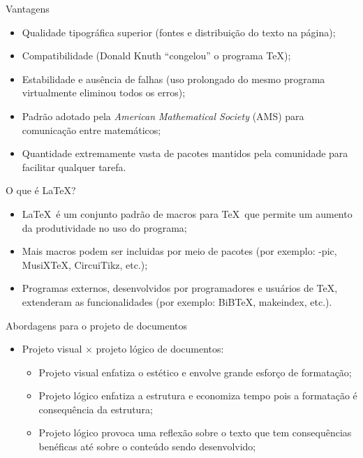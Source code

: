 \begin{frame}{Vantagens}
	\begin{itemize}
		\item Qualidade tipográfica superior (fontes e distribuição do texto na página);
		\pause
		\item Compatibilidade (Donald Knuth ``congelou'' o programa \TeX);
		\pause
		\item Estabilidade e ausência de falhas (uso prolongado do mesmo programa virtualmente eliminou todos os erros);
		\pause
		\item Padrão adotado pela \emph{American Mathematical Society} (AMS) para comunicação entre matemáticos;
		\pause
		\item Quantidade extremamente vasta de pacotes mantidos pela comunidade para facilitar qualquer tarefa.
	\end{itemize}
\end{frame}

\begin{frame}{O que é \LaTeX?}
	\begin{itemize}
		\item \LaTeX\ é um conjunto padrão de macros para \TeX\ que permite um aumento da produtividade no uso do programa;
		\pause
		\item Mais macros podem ser incluidas por meio de pacotes (por exemplo: \Xy-pic, MusiX\TeX, CircuiTikz, etc.);
		\pause
		\item Programas externos, desenvolvidos por programadores e usuários de \TeX, extenderam as funcionalidades (por exemplo: BiB\TeX, makeindex, etc.).
	\end{itemize}
\end{frame}

\begin{frame}{Abordagens para o projeto de documentos}
	\begin{itemize}
		\item Projeto visual $\times$ projeto lógico de documentos:
		\pause
		\begin{itemize}
			\item Projeto visual enfatiza o estético e envolve grande esforço de formatação;
			\pause
			\item Projeto lógico enfatiza a estrutura e economiza tempo pois a formatação é consequência da estrutura;
			\pause
			\item Projeto lógico provoca uma reflexão sobre o texto que tem consequências benéficas até sobre o conteúdo sendo desenvolvido;
		\end{itemize}
	\end{itemize}
\end{frame}

